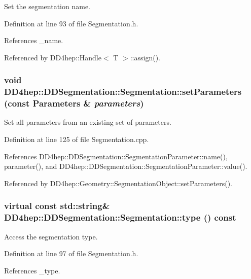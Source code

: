 Set the segmentation name. 

Definition at line 93 of file Segmentation.h.

References \_\-name.

Referenced by DD4hep::Handle$<$ T $>$::assign().\hypertarget{class_d_d4hep_1_1_d_d_segmentation_1_1_segmentation_af02e320c944cc14b394f1014a8538cfa}{
\subsubsection[{setParameters}]{\setlength{\rightskip}{0pt plus 5cm}void DD4hep::DDSegmentation::Segmentation::setParameters (const {\bf Parameters} \& {\em parameters})}}
\label{class_d_d4hep_1_1_d_d_segmentation_1_1_segmentation_af02e320c944cc14b394f1014a8538cfa}


Set all parameters from an existing set of parameters. 

Definition at line 125 of file Segmentation.cpp.

References DD4hep::DDSegmentation::SegmentationParameter::name(), parameter(), and DD4hep::DDSegmentation::SegmentationParameter::value().

Referenced by DD4hep::Geometry::SegmentationObject::setParameters().\hypertarget{class_d_d4hep_1_1_d_d_segmentation_1_1_segmentation_ad975bb46927b2da459d91295f95571df}{
\subsubsection[{type}]{\setlength{\rightskip}{0pt plus 5cm}virtual const std::string\& DD4hep::DDSegmentation::Segmentation::type () const}}
\label{class_d_d4hep_1_1_d_d_segmentation_1_1_segmentation_ad975bb46927b2da459d91295f95571df}


Access the segmentation type. 

Definition at line 97 of file Segmentation.h.

References \_\-type.

